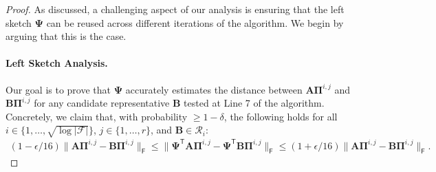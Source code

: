\documentclass{article}[11pt]
\theoremstyle{definition}
\newcommand{\bv}[1]{\boldsymbol{\mathbf{#1}}}
\newcommand{\T}{\mathsf{T}}
\newcommand{\Fro}{\mathsf{F}}
\newcommand{\F}{\mathcal{F}}
\begin{document}
\begin{proof}
As discussed, a challenging aspect of our analysis is ensuring that the left sketch $\bv{\Psi}$ can  be reused across different iterations of the algorithm. We begin by arguing that this is the case. 
    
\paragraph{Left Sketch Analysis.}
Our goal is to prove that $\bv \Psi$ accurately estimates the distance between $\bv A \bv{\Pi}^{i,j}$ and $\bv B \bv{\Pi}^{i,j}$ for any candidate representative $\bv{B}$ tested at Line 7 of the algorithm. Concretely, we claim that, with probability $\geq 1-\delta$, the following holds for all $i \in \{1, \ldots, \sqrt{\log |\F|}\}$, $j \in \{1, \ldots, r\}$, and $\bv{B} \in \mathcal{R}_{i}$:
\begin{align}
    \label{eq:left_sketch_guarantee}
    (1-\epsilon/16) \|\bv{A}\bv{\Pi}^{i,j} - \bv{B}\bv{\Pi}^{i,j}\|_\Fro \leq \|\bv{\Psi}^\T\bv{A}\bv{\Pi}^{i,j} - \bv{\Psi}^\T\bv{B}\bv{\Pi}^{i,j}\|_\Fro \leq (1+\epsilon/16) \|\bv{A}\bv{\Pi}^{i,j} - \bv{B}\bv{\Pi}^{i,j}\|_\Fro.
\end{align}


\end{proof}
\end{document}
